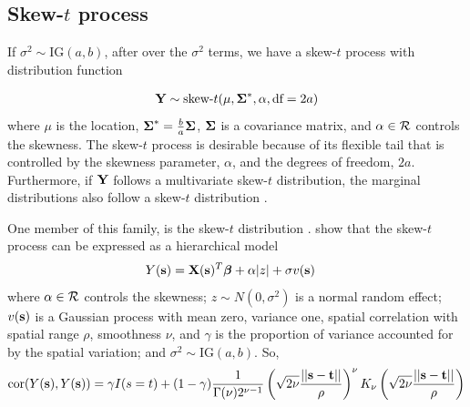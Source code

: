 \documentclass[11pt]{article}
\begin{document}
\subsection{Skew-$t$ process}
If $\sigma^2 \sim \text{IG}(a, b)$, after over the $\sigma^2$ terms, we have a skew-$t$ process with distribution function

\begin{align*}
  \mbox{\bf Y} \sim \text{skew-}t (\mu, \mbox{\boldmath $\Sigma$}^*, \alpha, \text{df} = 2a)
\end{align*}
where $\mu$ is the location, $\mbox{\boldmath $\Sigma$}^* = \frac{ b }{ a } \mbox{\boldmath $\Sigma$}$, $\mbox{\boldmath $\Sigma$}$ is a \Matern covariance matrix, and $\alpha \in {\cal R}$ controls the skewness.
The skew-$t$ process is desirable because of its flexible tail that is controlled by the skewness parameter, $\alpha$, and the degrees of freedom, $2a$.
Furthermore, if $\mbox{\bf Y}$ follows a multivariate skew-$t$ distribution, the marginal distributions also follow a skew-$t$ distribution \citep{Azzalini2003}.

One member of this family, is the skew-$t$ distribution \citep[see Appendix A.5]{Azzalini2003}.
\citet{Zhang2010} show that the skew-$t$ process can be expressed as a hierarchical model
\begin{align} \label{eq:fullmodel}
  Y(\mbox{\bf s}) &= \mbox{\bf X}(\mbox{\bf s})^T \mbox{\boldmath $\beta$} + \alpha |z| + \sigma v(\mbox{\bf s})
\end{align}
where $\alpha \in {\cal R}$ controls the skewness; $z \sim N(0, \sigma^2)$ is a normal random effect; $v(\mbox{\bf s})$ is a Gaussian process with mean zero, variance one, \Matern spatial correlation with spatial range $\rho$, smoothness $\nu$, and $\gamma$ is the proportion of variance accounted for by the spatial variation; and $\sigma^2 \sim \text{IG}(a, b)$.
So,
\begin{align}
  \text{cor}(Y(\mbox{\bf s}), Y(\mbox{\bf s})) = \gamma I(s = t) + (1 - \gamma)  \frac{ 1 }{ \Gamma(\nu) 2^{ \nu - 1}} \left( \sqrt{2\nu} \frac{ ||\mbox{\bf s} - \mbox{\bf t}|| }{ \rho } \right)^{\nu} K_{\nu} \left( \sqrt{2\nu} \frac{ ||\mbox{\bf s} - \mbox{\bf t}|| }{ \rho } \right)
\end{align}
\end{document}
